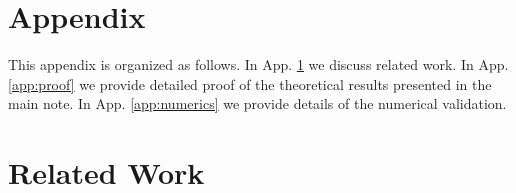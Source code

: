 \documentclass[a4paper,11pt]{article}
\theoremstyle{plain}
\theoremstyle{definition}
\begin{document}





















\newpage 
\appendix
\section*{Appendix}
This appendix is organized as follows. In App. \ref{app:relatedwork} we discuss related work. In App. \ref{app:proof} we provide detailed proof of the theoretical results presented in the main note. In App. \ref{app:numerics} we provide details of the numerical validation.


\section{Related Work} \label{app:relatedwork}
\end{document}
